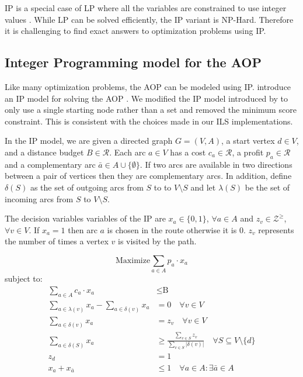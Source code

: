 \documentclass[honors]{union-cs-thesis}
\newcommand{\RR}{\mathcal{R}} %
\newcommand{\ZZ}{\mathcal{Z}} %
\newcommand{\set}[1]{\ensuremath{\{{#1}\}}} %
\newcommand{\sse}{\subseteq} %
\begin{document}
IP is a special case of LP where all the variables are constrained to use integer values \cite{ibm-int-programming}. While LP can be solved efficiently, the IP variant is NP-Hard. Therefore it is challenging to find exact answers to optimization problems using IP.

\subsection{Integer Programming model for the AOP}
Like many optimization problems, the AOP can be modeled using IP. \citeauthor{verbeeck2014extension} introduce an IP model for solving the AOP \cite{verbeeck2014extension}. We modified the IP model introduced by \citeauthor{verbeeck2014extension} to only use a single starting node rather than a set and removed the minimum score constraint. This is consistent with the choices made in our ILS implementations.

In the IP model, we are given a directed graph $G = (V,A)$, a start vertex $d \in V$, and a distance budget $B \in \RR$. Each arc $a \in V$ has a cost $c_a \in \RR$, a profit $p_a \in \RR$ and a complementary arc $\bar{a} \in A \cup \set{\emptyset}$. If two arcs are available in two directions between a pair of vertices then they are complementary arcs. In addition, define $\delta(S)$ as the set of outgoing arcs from $S$ to to $V \setminus S$ and let $\lambda(S)$ be the set of incoming arcs from $S$ to $V \setminus S$.

The decision variables variables of the IP are $x_a \in \set{0,1}$, $\forall a \in A$ and $z_v \in \ZZ^{\geq}$, $\forall v \in V$. If $x_a = 1$ then arc $a$ is chosen in the route otherwise it is 0. $z_v$ represents the number of times a vertex $v$ is visited by the path.

\begin{minipage}{\textwidth}
\begin{equation*}
    \text{Maximize} \sum_{a \in A}{p_a \cdot x_a}
\end{equation*}
subject to:
\begin{align}
\sum_{a \in A}{c_a \cdot x_a} &\leq \text{B} \label{eq:ip-cost}\\
\sum_{a \in \lambda(v)}{x_a}  -\sum_{a \in \delta(v)}{x_a} &= 0 \quad \forall v \in V\label{eq:ip-flow}\\
\sum_{a \in \delta(v)}{x_a} &= z_v \quad\forall v \in V \label{eq:ip-vertex}\\
\sum_{a \in \delta(S)}{x_a} &\geq \frac{\sum_{v \in S}{z_v}}{\sum_{v \in S}{|\delta(v)|}} \quad \forall S \sse V \setminus \set{d} \label{eq:ip-subtour}\\
z_d &= 1\label{eq:ip-start}\\
x_a + x_{\bar{a}} &\leq 1 \quad \forall a \in A: \exists\bar{a} \in A\label{eq:ip-complement}
\end{align}
\end{minipage}
\end{document}
